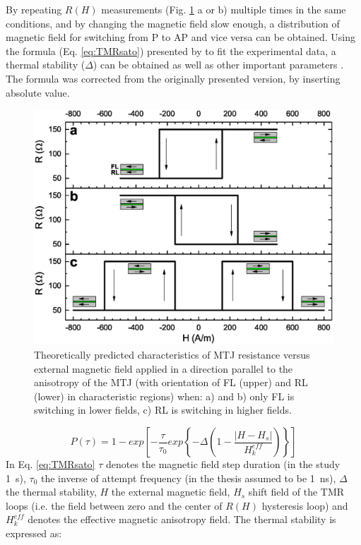     By repeating $R(H)$ measurements (Fig. \ref{PrinciplesMTJtmr} a or b) multiple times in the same conditions, and by changing the magnetic field slow enough, a distribution of magnetic field for switching from P to AP and vice versa can be obtained. Using the formula (Eq. \ref{eq:TMRsato}) presented by \citeauthor{sato2012cofeb} to fit the experimental data, a thermal stability ($\Delta$) can be obtained as well as other important parameters \cite{sato2012cofeb}. The formula was corrected from the originally presented version, by inserting absolute value.
    
    \begin{figure}[H]
        \centering
        \includegraphics[width=0.75\paperwidth]{img/03/MTJ_characteristics.eps}
        \caption{Theoretically predicted characteristics of MTJ resistance versus external magnetic field applied in a direction parallel to the anisotropy of the MTJ (with orientation of FL (upper) and RL (lower) in characteristic regions) when: a) and b) only FL is switching in lower fields, c) RL is switching in higher fields.}
        \label{PrinciplesMTJtmr}
    \end{figure}
    
    \begin{equation} \label{eq:TMRsato}
		P(\tau) = 1 - exp\left [ -\frac{\tau}{\tau_0}exp\left \{ -\Delta\left ( 1-\frac{|H-H_s|}{H_k^{eff}} \right ) \right \} \right ]
	\end{equation}
In Eq. \ref{eq:TMRsato} $\tau$ denotes the magnetic field step duration (in the study \SI{1}{\second}), $\tau_0$ the inverse of attempt frequency (in the thesis assumed to be \SI{1}{\nano\second}), $\Delta$ the thermal stability, $H$ the external magnetic field, $H_s$ shift field of the TMR loops (i.e. the field between zero and the center of $R(H)$ hysteresis loop) and $H_k^{eff}$ denotes the effective magnetic anisotropy field. The thermal stability is expressed as:


